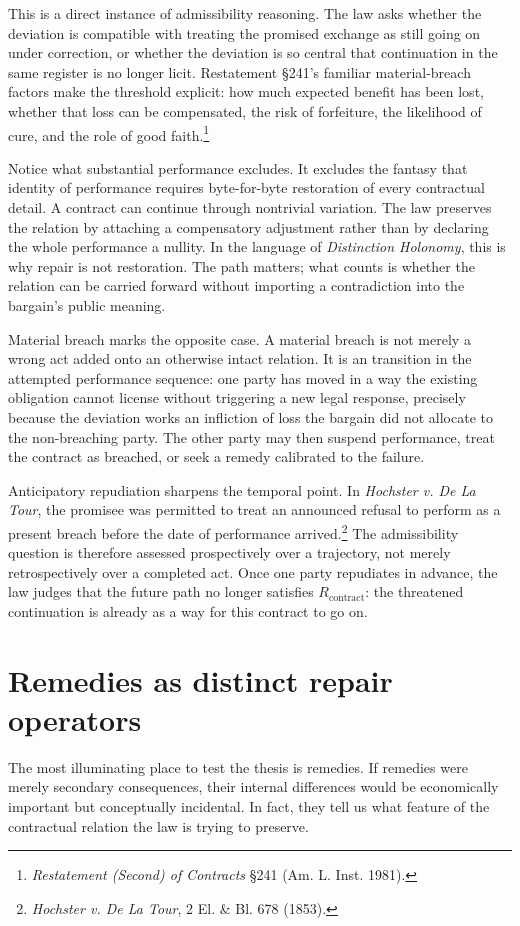 \documentclass[11pt]{article}
\begin{document}
This is a direct instance of admissibility reasoning. The law asks whether the deviation is compatible with treating the promised exchange as still going on under correction, or whether the deviation is so central that continuation in the same register is no longer licit. Restatement \S 241's familiar material-breach factors make the threshold explicit: how much expected benefit has been lost, whether that loss can be compensated, the risk of forfeiture, the likelihood of cure, and the role of good faith.\footnote{\textit{Restatement (Second) of Contracts} \S 241 (Am. L. Inst. 1981).}

Notice what substantial performance excludes. It excludes the fantasy that identity of performance requires byte-for-byte restoration of every contractual detail. A contract can continue through nontrivial variation. The law preserves the relation by attaching a compensatory adjustment rather than by declaring the whole performance a nullity. In the language of \textit{Distinction Holonomy}, this is why repair is not restoration. The path matters; what counts is whether the relation can be carried forward without importing a contradiction into the bargain's public meaning.

Material breach marks the opposite case. A material breach is not merely a wrong act added onto an otherwise intact relation. It is an \inadmissible{} transition in the attempted performance sequence: one party has moved in a way the existing obligation cannot license without triggering a new legal response, precisely because the deviation works an infliction of loss the bargain did not allocate to the non-breaching party. The other party may then suspend performance, treat the contract as breached, or seek a remedy calibrated to the failure.

Anticipatory repudiation sharpens the temporal point. In \textit{Hochster v. De La Tour}, the promisee was permitted to treat an announced refusal to perform as a present breach before the date of performance arrived.\footnote{\textit{Hochster v. De La Tour}, 2 El. \& Bl. 678 (1853).} The admissibility question is therefore assessed prospectively over a trajectory, not merely retrospectively over a completed act. Once one party repudiates in advance, the law judges that the future path no longer satisfies $R_{\mathrm{contract}}$: the threatened continuation is already \inadmissible{} as a way for this contract to go on.

\section{Remedies as distinct repair operators}
The most illuminating place to test the thesis is remedies. If remedies were merely secondary consequences, their internal differences would be economically important but conceptually incidental. In fact, they tell us what feature of the contractual relation the law is trying to preserve.
\end{document}
